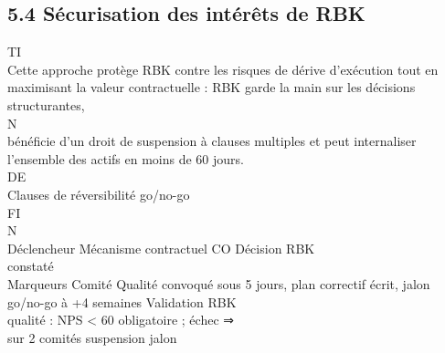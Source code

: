 \documentclass[12pt,landscape,a4paper]{article}
\begin{document}
\subsection{5.4 Sécurisation des intérêts de RBK}
\vspace{0.5em}
\vspace{0.5em}
\vspace{0.5em}
\vspace{0.5em}
TI\\
Cette approche protège RBK contre les risques de dérive d’exécution tout en maximisant la valeur contractuelle : RBK garde la main sur les décisions structurantes,\\
\vspace{0.5em}
\vspace{0.5em}
\vspace{0.5em}
\vspace{0.5em}
N\\
bénéficie d’un droit de suspension à clauses multiples et peut internaliser l’ensemble des actifs en moins de 60 jours.\\
\vspace{0.5em}
\vspace{0.5em}
\vspace{0.5em}
\vspace{0.5em}
DE\\
Clauses de réversibilité go/no-go\\
\vspace{0.5em}
\vspace{0.5em}
\vspace{0.5em}
\vspace{0.5em}
FI\\
N\\
Déclencheur           Mécanisme contractuel          CO                                                                                  Décision RBK\\
constaté\\
Marqueurs             Comité Qualité convoqué sous 5 jours, plan correctif écrit, jalon go/no-go à +4 semaines                           Validation RBK\\
qualité : NPS \textless{} 60                                                                                                                       obligatoire ; échec ⇒\\
sur 2 comités                                                                                                                            suspension jalon\\
\end{document}
